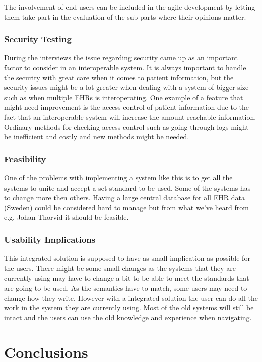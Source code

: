 \documentclass[14pt]{article}
\begin{document}
The involvement of end-users can be included in the agile development by letting them take part in the evaluation of the sub-parts where their opinions matter. 

\subsubsection{Security Testing}
During the interviews the issue regarding security came up as an important factor to consider in an interoperable system. It is always important to handle the security with great care when it comes to patient information, but the security issues might be a lot greater when dealing with a system of bigger size such as when multiple \glspl{EHR} is interoperating. One example of a feature that might need improvement is the access control of patient information due to the fact that an interoperable system will increase the amount reachable information. Ordinary methods for checking access control such as going through logs might be inefficient and costly and new methods might be needed.

\subsubsection{Feasibility}
One of the problems with implementing a system like this is to get all the systems to unite and accept a set standard to be used. Some of the systems has to change more then others.
Having a large central database for all \gls{EHR} data (Sweden) could be considered hard to manage but from what we've heard from e.g. Johan Thorvid \cite{Cambio} it should be feasible.

\subsubsection{Usability Implications}
This integrated solution is supposed to have as small implication as possible for the users. There might be some small changes as the systems that they are currently using may have to change a bit to be able to meet the standards that are going to be used. As the semantics have to match, some users may need to change how they write. However with a integrated solution the user can do all the work in the system they are currently using. Most of the old systems will still be intact and the users can use the old knowledge and experience when navigating.

\newpage

\section{Conclusions}
\label{sec:Conclusions}
\end{document}
